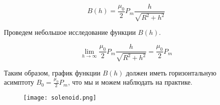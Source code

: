     \begin{equation*}
        B(h) = \frac{\mu_0}{2} P_m \frac{h}{\sqrt{R^2 + h^2}}
    \end{equation*}

    Проведем небольшое исследование функции $B(h)$.

    \begin{equation*}
        \lim_{h \rightarrow \infty} \frac{\mu_0}{2} P_m \frac{h}{\sqrt{R^2 + h^2}} = \frac{\mu_0}{2} P_m
    \end{equation*}

    Таким образом, график функции $B(h)$ должен иметь горизонтальную асимптоту $B_0 = \frac{\mu_0}{2} P_m$, что мы и можем
    наблюдать на практике.

    \begin{figure}[h!]
        \centering
        \texttt{[image: solenoid.png]}
        \caption{}
    \end{figure}

